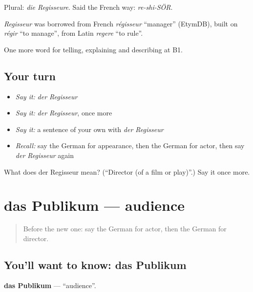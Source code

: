 Plural: \emph{die Regisseure}. Said the French way: \emph{re-shi-SÖR}.

\begin{cousinweb}
\emph{Regisseur} was borrowed from French \emph{régisseur} \textquotedblleft{}manager\textquotedblright{} (EtymDB), built on \emph{régir} \textquotedblleft{}to manage\textquotedblright{}, from Latin \emph{regere} \textquotedblleft{}to rule\textquotedblright{}.
\end{cousinweb}

\begin{grammarlens}[title={What you've built}]
One more word for telling, explaining and describing at B1.
\end{grammarlens}

\subsection*{Your turn}
\begin{itemize}
\raggedright
  \item \emph{Say it:} \emph{der Regisseur}
  \item \emph{Say it:} \emph{der Regisseur}, once more
  \item \emph{Say it:} a sentence of your own with \emph{der Regisseur}
  \item \emph{Recall:} say the German for appearance, then the German for actor, then say \emph{der Regisseur} again
\end{itemize}

\begin{tcolorbox}[breakable,colback=teal!4,colframe=teal!35!black,title={Before you move on}]
What does der Regisseur mean? (\textquotedblleft{}Director (of a film or play)\textquotedblright{}.) Say it once more.
\end{tcolorbox}
\section[das Publikum]{das Publikum — audience}

\label{lesson:GE-C517-publikum}



\begin{quote}
Before the new one: say the German for actor, then the German for director.
\end{quote}

\subsection*{You'll want to know: das Publikum}
\textbf{das Publikum} — \textquotedblleft{}audience\textquotedblright{}.

